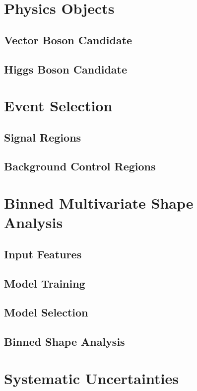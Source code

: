\section{Physics Objects}

\subsection{Vector Boson Candidate}

\subsection{Higgs Boson Candidate}

\section{Event Selection}

\subsection{Signal Regions}

\subsection{Background Control Regions}

\section{Binned Multivariate Shape Analysis}

\subsection{Input Features}

\subsection{Model Training}

\subsection{Model Selection}

\subsection{Binned Shape Analysis}

\section{Systematic Uncertainties}

